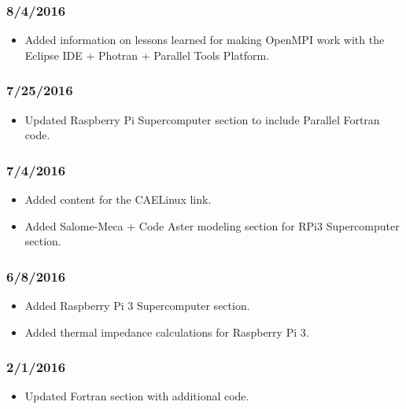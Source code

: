 \subsubsection{8/4/2016}

\begin{itemize}
\item Added information on lessons learned for making OpenMPI work with the Eclipse IDE + Photran + Parallel Tools Platform.
\end{itemize}

\subsubsection{7/25/2016}

\begin{itemize}
\item Updated Raspberry Pi Supercomputer section to include Parallel Fortran code.
\end{itemize}

\subsubsection{7/4/2016}

\begin{itemize}
\item Added content for the CAELinux link.
\item Added Salome-Meca + Code Aster modeling section for RPi3 Supercomputer section.
\end{itemize}

\subsubsection{6/8/2016}

\begin{itemize}
\item Added Raspberry Pi 3 Supercomputer section.
\item Added thermal impedance calculations for Raspberry Pi 3.
\end{itemize}

\subsubsection{2/1/2016}

\begin{itemize}
\item Updated Fortran section with additional code.
\end{itemize}

